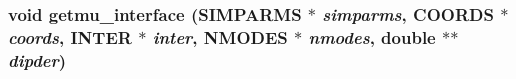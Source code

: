 \subsubsection{\setlength{\rightskip}{0pt plus 5cm}void getmu\_\-interface ({\bf SIMPARMS} $\ast$ {\em simparms}, {\bf COORDS} $\ast$ {\em coords}, {\bf INTER} $\ast$ {\em inter}, {\bf NMODES} $\ast$ {\em nmodes}, double $\ast$$\ast$ {\em dipder})}\label{getsfg_8c_52440836135a3363def643bd69d44ee4}


